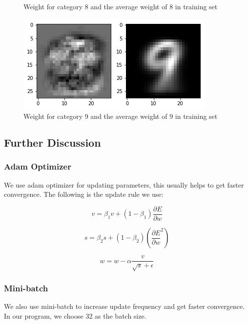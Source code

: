 \documentclass{article}
\begin{document}
\begin{figure}[thbp]
\begin{minipage}{0.48\textwidth}
		\caption{Weight for category 8 and the average weight of 8 in training set}
	\end{minipage}\hfill
	\begin {minipage}{0.48\textwidth}
	\centering
	\includegraphics[width=\textwidth]{pics/9.png}
	\caption{Weight for category 9 and the average weight of 9 in training set}
\end{minipage}
\end{figure}

\subsection{Further Discussion}
\subsubsection{Adam Optimizer}
We use adam optimizer for updating parameters, this usually helps to get faster convergence. The following is the update rule we use:

\begin{equation*}
v = \beta_1 v + (1-\beta_1)\frac{\partial E}{\partial w}
\end{equation*}

\begin{equation*}
s = \beta_2 s + (1-\beta_2)(\frac{\partial E}{\partial w}^2)
\end{equation*}

\begin{equation*}
w = w - \alpha \frac{v}{\sqrt{s} + \epsilon}
\end{equation*}

\subsubsection{Mini-batch}
We also use mini-batch to increase update frequency and get faster convergence. In our program, we choose 32 as the batch size.
\end{document}
